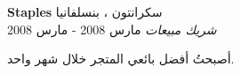 \foreignlanguage{english}{\textbf{Staples}} \hfill سكرانتون ، بنسلفانيا\\
\textit{شريك مبيعات} \hfill مارس 2008 - مارس 2008\\
\vspace*{-4pt}
\begin{achievements}
	\item أصبحتُ أفضل بائعي المتجر خلال شهر واحد.
\end{achievements}
